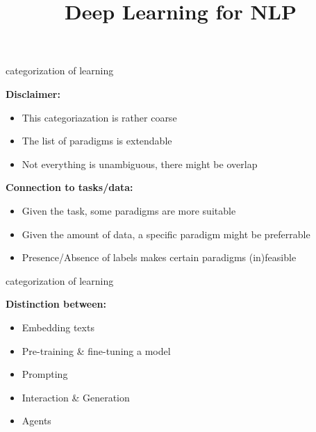 \documentclass[11pt,compress,t,notes=noshow, xcolor=table]{beamer}
\title{Deep Learning for NLP}
\begin{document}


\begin{vbframe}{categorization of learning}

\vfill

\textbf{Disclaimer:}

	\begin{itemize}
		\item This categoriazation is rather coarse
		\item The list of paradigms is extendable
		\item Not everything is unambiguous, there might be overlap
	\end{itemize}
	
\vspace{.3cm}

\textbf{Connection to tasks/data:}

	\begin{itemize}
		\item Given the task, some paradigms are more suitable
		\item Given the amount of data, a specific paradigm might be preferrable
		\item Presence/Absence of labels makes certain paradigms (in)feasible
	\end{itemize}

\vfill

\end{vbframe}


\begin{vbframe}{categorization of learning}

\vfill

\textbf{Distinction between:}

	\begin{itemize}
		\item Embedding texts
		\item Pre-training \& fine-tuning a model
		\item Prompting
		\item Interaction \& Generation
		\item Agents
	\end{itemize}

\vfill

\end{vbframe}
\end{document}
